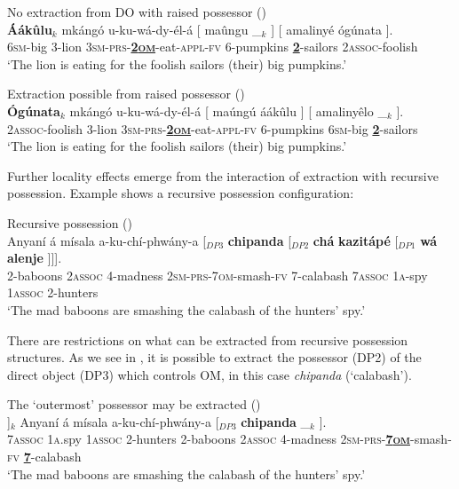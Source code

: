 \documentclass[output=paper,colorlinks,citecolor=brown]{langscibook}
\begin{document}
\ea%
    \label{ex:branan:12}
    No extraction from DO with raised possessor \hfill{(\citealt[55, ex. 22e]{Mchombo2004})}\\
    \gll    *\textbf{\'{A}ákûlu}$_{k}$ mkángó u-ku-wá-dy-él-á [ maûngu \_$_{k}$ ] [ amalinyé ógúnata ]. \\
            \hphantom{*}6\textsc{sm}-big 3-lion 3\textsc{sm-prs}-\textbf{\underline{2\textsc{om}}}-eat-\textsc{appl-fv} {} 6-pumpkins {} {} {} \textbf{\underline{2}}-sailors 2\textsc{assoc}-foolish {} \\
    \glt    `The lion is eating for the foolish sailors (their) big pumpkins.'
\z

\ea%
    \label{ex:branan:13}
    Extraction possible from raised possessor \hfill{(\citealt[56, ex. 22g]{Mchombo2004})}\\
    \gll    \textbf{\'{O}gúnata}$_{k}$ mkángó u-ku-wá-dy-él-á [ maúngú áákûlu ] [ amalinyêlo \_$_{k}$ ]. \\
            2\textsc{assoc}-foolish 3-lion 3\textsc{sm-prs}-\textbf{\underline{2\textsc{om}}}-eat-\textsc{appl-fv} {} 6-pumpkins 6\textsc{sm}-big  {} {} \textbf{\underline{2}}-sailors  \\
\glt        `The lion is eating for the foolish sailors (their) big pumpkins.'
\z

Further locality effects emerge from the interaction of extraction with recursive possession. Example  shows a recursive possession configuration:

\ea%
    \label{ex:branan:14}
    Recursive possession \hfill{(\citealt[60, ex. 29]{Mchombo2004})}\\
    \gll    Anyaní á mísala a-ku-chí-phwány-a [$_{DP3}$ \textbf{chipanda}  [$_{DP2}$ \textbf{chá}  \textbf{kazitápé} [$_{DP1}$ \textbf{wá} \textbf{alenje} ]]]. \\
            2-baboons 2\textsc{assoc} 4-madness 2\textsc{sm-prs}-7\textsc{om}-smash-\textsc{fv} {} 7-calabash {} 7\textsc{assoc} 1\textsc{a}-spy {} 1\textsc{assoc} 2-hunters  \\
    \glt    `The mad baboons are smashing the calabash of the hunters’ spy.'
\z

There are restrictions on what can be extracted from recursive possession structures. As we see in , it is possible to extract the possessor (DP2) of the direct object (DP3) which controls OM, in this case \emph{chipanda} (`calabash').

\ea%
    \label{ex:branan:15}
    The `outermost' possessor may be extracted \hfill{(\citealt[60, ex. 30a]{Mchombo2004})}\\
    \gll    [$_{DP2}$ \textbf{Chá}  \textbf{kazitápé} [$_{DP1}$ \textbf{wá} \textbf{alenje} ]]$_{k}$ Anyaní á mísala a-ku-chí-phwány-a [$_{DP3}$ \textbf{chipanda}   \_$_{k}$ ].  \\
            {} 7\textsc{assoc} 1\textsc{a}.spy {} 1\textsc{assoc} 2-hunters {}  2-baboons 2\textsc{assoc} 4-madness 2\textsc{sm-prs}-\textbf{\underline{7\textsc{om}}}-smash-\textsc{fv} {} \textbf{\underline{7}}-calabash   \\
    \glt    `The mad baboons are smashing the calabash of the hunters’ spy.'
\z
\end{document}
